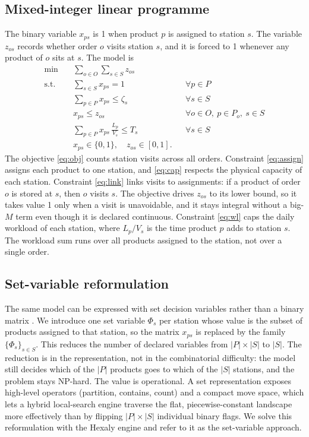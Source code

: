 \documentclass[]{interact}
\begin{document}
\subsection{Mixed-integer linear programme}
The binary variable $x_{ps}$ is 1 when product $p$ is assigned to station $s$. The variable $z_{os}$ records whether order $o$ visits station $s$, and it is forced to 1 whenever any product of $o$ sits at $s$. The model is
\begin{align}
\min \quad & \sum_{o \in O} \sum_{s \in S} z_{os} \label{eq:obj}\\
\text{s.t.} \quad
& \sum_{s \in S} x_{ps} = 1 && \forall p \in P \label{eq:assign}\\
& \sum_{p \in P} x_{ps} \le \zeta_s && \forall s \in S \label{eq:cap}\\
& x_{ps} \le z_{os} && \forall o \in O,\ p \in P_o,\ s \in S \label{eq:link}\\
& \sum_{p \in P} x_{ps}\,\frac{L_p}{V_s} \le T_s && \forall s \in S \label{eq:wl}\\
& x_{ps} \in \{0,1\},\quad z_{os} \in [0,1]. && \label{eq:dom}
\end{align}
The objective \eqref{eq:obj} counts station visits across all orders. Constraint \eqref{eq:assign} assigns each product to one station, and \eqref{eq:cap} respects the physical capacity of each station. Constraint \eqref{eq:link} links visits to assignments: if a product of order $o$ is stored at $s$, then $o$ visits $s$. The objective drives $z_{os}$ to its lower bound, so it takes value 1 only when a visit is unavoidable, and it stays integral without a big-$M$ term even though it is declared continuous. Constraint \eqref{eq:wl} caps the daily workload of each station, where $L_p/V_s$ is the time product $p$ adds to station $s$. The workload sum runs over all products assigned to the station, not over a single order.

\subsection{Set-variable reformulation}\label{sec:setvar}
The same model can be expressed with set decision variables rather than a binary matrix \citep{blaisemodeling}. We introduce one set variable $\Phi_s$ per station whose value is the subset of products assigned to that station, so the matrix $x_{ps}$ is replaced by the family $\{\Phi_s\}_{s \in S}$. This reduces the number of declared variables from $|P|\times|S|$ to $|S|$. The reduction is in the representation, not in the combinatorial difficulty: the model still decides which of the $|P|$ products goes to which of the $|S|$ stations, and the problem stays NP-hard. The value is operational. A set representation exposes high-level operators (partition, contains, count) and a compact move space, which lets a hybrid local-search engine traverse the flat, piecewise-constant landscape more effectively than by flipping $|P|\times|S|$ individual binary flags. We solve this reformulation with the Hexaly engine and refer to it as the set-variable approach.
\end{document}
